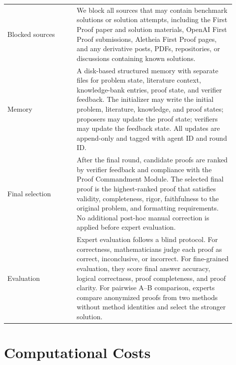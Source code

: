 \documentclass{article}
\begin{document}
\begin{table}[t]
\begin{tabular}{p{0.28\linewidth} p{0.64\linewidth}}
Blocked sources 
& We block all sources that may contain benchmark solutions or solution attempts, including the First Proof paper and solution materials, OpenAI First Proof submissions, Aletheia First Proof pages, and any derivative posts, PDFs, repositories, or discussions containing known solutions. \\

Memory 
& A disk-based structured memory with separate files for problem state, literature context, knowledge-bank entries, proof state, and verifier feedback. The initializer may write the initial problem, literature, knowledge, and proof states; proposers may update the proof state; verifiers may update the feedback state. All updates are append-only and tagged with agent ID and round ID. \\

Final selection 
& After the final round, candidate proofs are ranked by verifier feedback and compliance with the Proof Commandment Module. The selected final proof is the highest-ranked proof that satisfies validity, completeness, rigor, faithfulness to the original problem, and formatting requirements. No additional post-hoc manual correction is applied before expert evaluation. \\

Evaluation 
& Expert evaluation follows a blind protocol. For correctness, mathematicians judge each proof as correct, inconclusive, or incorrect. For fine-grained evaluation, they score final answer accuracy, logical correctness, proof completeness, and proof clarity. For pairwise A--B comparison, experts compare anonymized proofs from two methods without method identities and select the stronger solution. \\
\bottomrule
\end{tabular}
\vspace{-2mm}
\end{table}

\section{Computational Costs}
\label{app-computational-costs}
\end{document}
